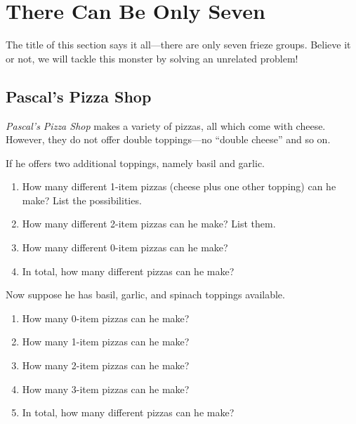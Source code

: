 \newpage



\section{There Can Be Only Seven}


The title of this section says it all---there are only seven frieze
groups. Believe it or not, we will tackle this monster by solving an
unrelated problem!

\subsection{Pascal's Pizza Shop}

\textit{Pascal's Pizza Shop} makes a variety of pizzas, all which come
with cheese.  However, they do not offer double toppings---no ``double
cheese'' and so on.

\begin{ques}
If he offers two additional toppings, namely basil and garlic.
\begin{enumerate}
\item How many different 1-item pizzas (cheese plus one other
  topping) can he make?  List the possibilities.
\item How many different 2-item pizzas can he make?  List them.
\item How many different 0-item pizzas can he make?
\item In total, how many different pizzas can he make?
\end{enumerate}
\end{ques}
\QM

\begin{ques}
Now suppose he has basil, garlic, and spinach toppings
available.
\begin{enumerate}
\item How many 0-item pizzas can he make?
\item How many 1-item pizzas can he make?
\item How many 2-item pizzas can he make?
\item How many 3-item pizzas can he make?
\item In total, how many different pizzas can he make?
\end{enumerate}
\end{ques}
\QM

